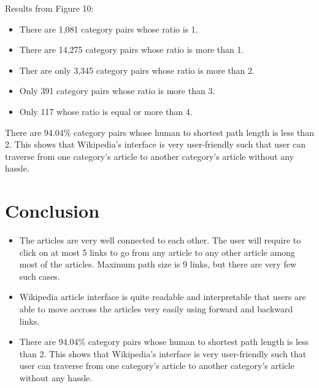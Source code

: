 \documentclass[12pt]{article}
\begin{document}
Results from Figure 10:
\begin{itemize}
	\item There are 1,081 category pairs whose ratio is 1.
	\item There are 14,275 category pairs whose ratio is more than 1.
	\item Ther are only 3,345 category pairs whose ratio is more than 2.
	\item Only 391 category pairs whose ratio is more than 3. 
	\item Only 117 whose ratio is equal or more than 4.
\end{itemize}

There are 94.04\% category pairs whose human to shortest path length is less than 2. This shows that Wikipedia's interface is very user-friendly such that user can traverse from one category's article to another category's article without any hassle.
	
\section{Conclusion}
\begin{itemize}
	\item The articles are very well connected to each other. The user will require to click on at most 5 links to go from any article to any other article among most of the articles. Maximum path size is 9 links, but there are very few such cases.
	\item Wikipedia article interface is quite readable and interpretable that users are able to move accross the articles very easily using forward and backward links.
	\item There are 94.04\% category pairs whose human to shortest path length is less than 2. This shows that Wikipedia's interface is very user-friendly such that user can traverse from one category's article to another category's article without any hassle.
\end{itemize}









  





	
\end{document}
